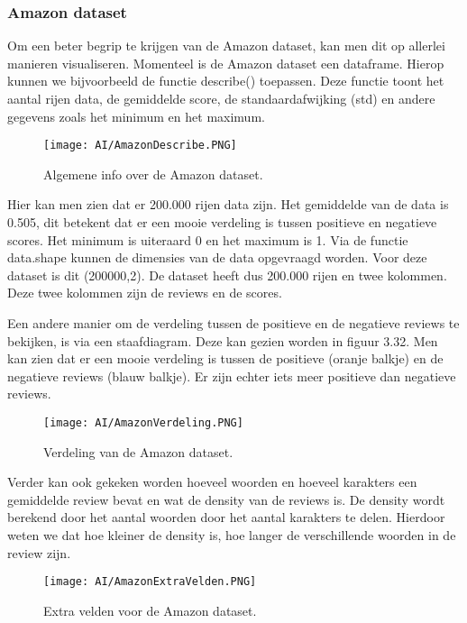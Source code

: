 \subsubsection{Amazon dataset}
Om een beter begrip te krijgen van de Amazon dataset, kan men dit op allerlei manieren visualiseren. Momenteel is de Amazon dataset een dataframe. Hierop kunnen we bijvoorbeeld de functie describe() toepassen. Deze functie toont het aantal rijen data, de gemiddelde score, de standaardafwijking (std) en andere gegevens zoals het minimum en het maximum. 

\begin{figure}[!htbp]
    \texttt{[image: AI/AmazonDescribe.PNG]}
    \caption{\label{amazondescribe}Algemene info over de Amazon dataset.}
\end{figure}
\FloatBarrier 

Hier kan men zien dat er 200.000 rijen data zijn. Het gemiddelde van de data is 0.505, dit betekent dat er een mooie verdeling is tussen positieve en negatieve scores. Het minimum is uiteraard 0 en het maximum is 1. Via de functie data.shape kunnen de dimensies van de data opgevraagd worden. Voor deze dataset is dit (200000,2). De dataset heeft dus 200.000 rijen en twee kolommen. Deze twee kolommen zijn de reviews en de scores. 

Een andere manier om de verdeling tussen de positieve en de negatieve reviews te bekijken, is via een staafdiagram. Deze kan gezien worden in figuur 3.32. Men kan zien dat er een mooie verdeling is tussen de positieve (oranje balkje) en de negatieve reviews (blauw balkje). Er zijn echter iets meer positieve dan negatieve reviews.

\begin{figure}[!htbp]
    \texttt{[image: AI/AmazonVerdeling.PNG]}
    \caption{\label{amazonverdeling}Verdeling van de Amazon dataset.}
\end{figure}
\FloatBarrier 

Verder kan ook gekeken worden hoeveel woorden en hoeveel karakters een gemiddelde review bevat en wat de density van de reviews is. De density wordt berekend door het aantal woorden door het aantal karakters te delen. Hierdoor weten we dat hoe kleiner de density is, hoe langer de verschillende woorden in de review zijn. 

\begin{figure}[!htbp]
    \texttt{[image: AI/AmazonExtraVelden.PNG]}
    \caption{\label{amazonaantalwoorden}Extra velden voor de Amazon dataset.}
\end{figure}
\FloatBarrier

